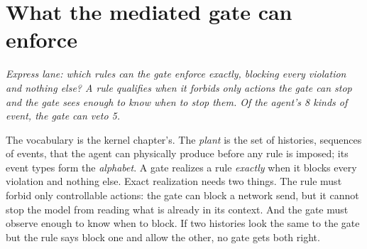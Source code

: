 \documentclass[11pt,a4paper]{article}
\theoremstyle{definition}
\begin{document}




\pdexercisepointer{\ref{ex:sealed-pairs}}{\ref{ex:sealed-gate-work}}{\pageref{ex:sealed-pairs}}

\section{What the mediated gate can enforce}\label{sec:sealed-enforceability}

\noindent\emph{Express lane: which rules can the gate enforce exactly,
blocking every violation and nothing else? A rule qualifies when it forbids
only actions the gate can stop and the gate sees enough to know when to stop
them. Of the agent's 8 kinds of event, the gate can veto 5.}

The vocabulary is the kernel chapter's. The \emph{plant} is the set of
histories, sequences of events, that the agent can physically produce before
any rule is imposed; its event types form the \emph{alphabet}. A gate
realizes a rule \emph{exactly} when it blocks every violation and nothing else. Exact realization needs two
things. The rule must forbid only controllable actions: the gate can block a
network send, but it cannot stop the model from reading what is already in its
context. And the gate must observe enough to know when to block. If two
histories look the same to the gate but the rule says block one and allow the
other, no gate gets both right.
\end{document}
